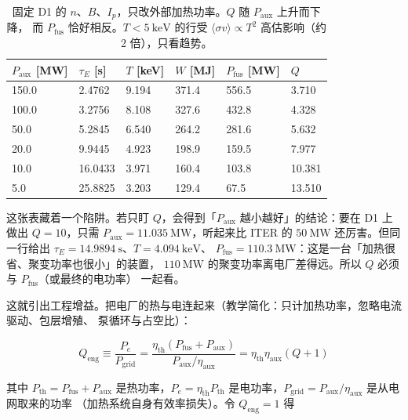 \begin{table}[htbp]
\centering
\small
\caption{固定 D1 的 $n$、$B$、$I_p$，只改外部加热功率。$Q$ 随 $P_{\mathrm{aux}}$ 上升而下降，
而 $P_{\mathrm{fus}}$ 恰好相反。$T<5\ \mathrm{keV}$ 的行受 $\langle\sigma v\rangle\propto T^2$
高估影响（约 2 倍），只看趋势。}
\label{tab:app-u-qaux}
\begin{tabular}{@{}p{2.0cm}p{1.8cm}p{1.7cm}p{1.7cm}p{2.0cm}p{1.6cm}@{}}
\toprule
$P_{\mathrm{aux}}$ [MW] & $\tau_E$ [s] & $T$ [keV] & $W$ [MJ] & $P_{\mathrm{fus}}$ [MW] & $Q$ \\
\midrule
150.0 & 2.4762  & 9.194 & 371.4 & 556.5 & 3.710 \\
100.0 & 3.2756  & 8.108 & 327.6 & 432.8 & 4.328 \\
50.0  & 5.2845  & 6.540 & 264.2 & 281.6 & 5.632 \\
20.0  & 9.9445  & 4.923 & 198.9 & 159.5 & 7.977 \\
10.0  & 16.0433 & 3.971 & 160.4 & 103.8 & 10.381 \\
5.0   & 25.8825 & 3.203 & 129.4 & 67.5  & 13.510 \\
\bottomrule
\end{tabular}

\end{table}

这张表藏着一个陷阱。若只盯 $Q$，会得到「$P_{\mathrm{aux}}$ 越小越好」的结论：要在 D1 上做出
$Q=10$，只需 $P_{\mathrm{aux}} = 11.035\ \mathrm{MW}$，听起来比 ITER 的 $50\ \mathrm{MW}$
还厉害。但同一行给出 $\tau_E = 14.9894\ \mathrm{s}$、$T = 4.094\ \mathrm{keV}$、
$P_{\mathrm{fus}} = 110.3\ \mathrm{MW}$：这是一台「加热很省、聚变功率也很小」的装置，
$110\ \mathrm{MW}$ 的聚变功率离电厂差得远。所以 $Q$ 必须与 $P_{\mathrm{fus}}$（或最终的电功率）
一起看。

这就引出工程增益。把电厂的热与电连起来（教学简化：只计加热功率，忽略电流驱动、包层增殖、
泵循环与占空比）：

\begin{equation}
Q_{\mathrm{eng}} \equiv \frac{P_e}{P_{\mathrm{grid}}}
= \frac{\eta_{\mathrm{th}}\left(P_{\mathrm{fus}}+P_{\mathrm{aux}}\right)}{P_{\mathrm{aux}}/\eta_{\mathrm{aux}}}
= \eta_{\mathrm{th}}\eta_{\mathrm{aux}}\left(Q+1\right)
\label{eq:app-u-qeng}
\end{equation}

其中 $P_{\mathrm{th}} = P_{\mathrm{fus}}+P_{\mathrm{aux}}$ 是热功率，$P_e = \eta_{\mathrm{th}}P_{\mathrm{th}}$
是电功率，$P_{\mathrm{grid}} = P_{\mathrm{aux}}/\eta_{\mathrm{aux}}$ 是从电网取来的功率
（加热系统自身有效率损失）。令 $Q_{\mathrm{eng}}=1$ 得

